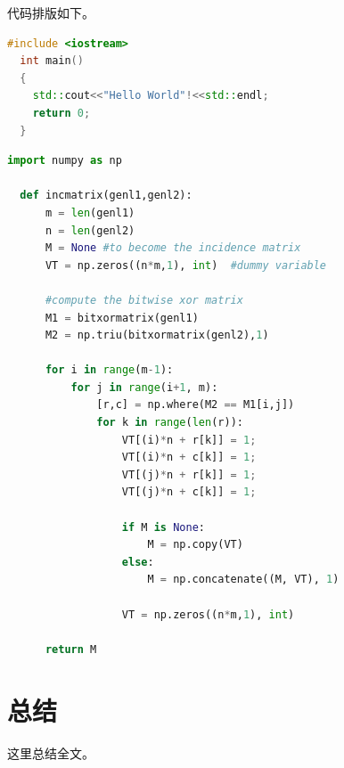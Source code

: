 \documentclass[12pt]{article} %
\begin{document}
代码排版如下。
\begin{Code}

\begin{lstlisting}[language=C++, caption=Cpp example]
  #include <iostream>
  int main()
  {
    std::cout<<"Hello World"!<<std::endl;
    return 0;
  }
\end{lstlisting}
\end{Code}
\begin{Code}
  
\begin{lstlisting}[language=Python, caption=Python example]
  import numpy as np
      
  def incmatrix(genl1,genl2):
      m = len(genl1)
      n = len(genl2)
      M = None #to become the incidence matrix
      VT = np.zeros((n*m,1), int)  #dummy variable
      
      #compute the bitwise xor matrix
      M1 = bitxormatrix(genl1)
      M2 = np.triu(bitxormatrix(genl2),1) 
  
      for i in range(m-1):
          for j in range(i+1, m):
              [r,c] = np.where(M2 == M1[i,j])
              for k in range(len(r)):
                  VT[(i)*n + r[k]] = 1;
                  VT[(i)*n + c[k]] = 1;
                  VT[(j)*n + r[k]] = 1;
                  VT[(j)*n + c[k]] = 1;
                  
                  if M is None:
                      M = np.copy(VT)
                  else:
                      M = np.concatenate((M, VT), 1)
                  
                  VT = np.zeros((n*m,1), int)
      
      return M
  \end{lstlisting}
\end{Code}

\FloatBarrier %
\section{总结}
这里总结全文。




\newpage
\printbibliography
\end{document}
